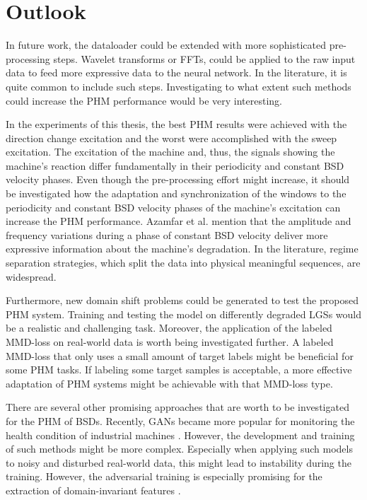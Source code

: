 \chapter{Outlook}
In future work, the dataloader could be extended with more sophisticated pre-processing steps. Wavelet transforms or FFTs, could be applied to the raw input data to feed more expressive data to the neural network. In the literature, it is quite common to include such steps. Investigating to what extent such methods could increase the PHM performance would be very interesting.

In the experiments of this thesis, the best PHM results were achieved with the direction change excitation and the worst were accomplished with the sweep excitation. The excitation of the machine and, thus, the signals showing the machine’s reaction differ fundamentally in their periodicity and constant BSD velocity phases. Even though the pre-processing effort might increase, it should be investigated how the adaptation and synchronization of the windows to the periodicity and constant BSD velocity phases of the machine's excitation can increase the PHM performance. Azamfar et al. \cite{AZAMFAR2020103932} mention that the amplitude and frequency variations during a phase of constant BSD velocity deliver more expressive information about the machine's degradation. In the literature, regime separation strategies, which split the data into physical meaningful sequences, are widespread.

Furthermore, new domain shift problems could be generated to test the proposed PHM system. Training and testing the model on differently degraded LGSs would be a realistic and challenging task.
Moreover, the application of the labeled MMD-loss on real-world data is worth being investigated further. A labeled MMD-loss that only uses a small amount of target labels might be beneficial for some PHM tasks.  If labeling some target samples is acceptable, a more effective adaptation of PHM systems might be achievable with that MMD-loss type.

There are several other promising approaches that are worth to be investigated for the PHM of BSDs. Recently, GANs became more popular for monitoring the health condition of industrial machines \cite{Zhang2019}. However, the development and training of such methods might be more complex. Especially when applying such models to noisy and disturbed real-world data, this might lead to instability during the training. However, the adversarial training is especially promising for the extraction of domain-invariant features \cite{Zhang2019}. 



